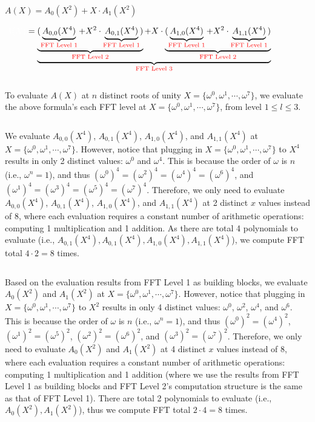 $A(X) = A_0(X^2) + X \cdot A_1(X^2)$

$\mathcolor{white}{A(X)} = \underbrace{\underbrace{(\underbrace{A_{0,0}(X^4)}_{\text{\textcolor{red}{FFT Level 1}}} + X^2\cdot \underbrace{A_{0,1}(X^4)}_{\text{\textcolor{red}{FFT Level 1}}})}_{\text{\textcolor{red}{FFT Level 2}}} + X \cdot \underbrace{(\underbrace{A_{1,0}(X^4)}_{\text{\textcolor{red}{FFT Level 1}}} + X^2\cdot \underbrace{A_{1,1}(X^4)}_{\text{\textcolor{red}{FFT Level 1}}})}_{\text{\textcolor{red}{FFT Level 2}}}}_{\text{\textcolor{red}{FFT Level 3}}}$

$ $

To evaluate $A(X)$ at $n$ distinct roots of unity $X = \{\omega^0, \omega^1, \cdots, \omega^7\}$, we evaluate the above formula's each FFT level at $X = \{\omega^0, \omega^1, \cdots, \omega^7\}$, from level $1 \leq l \leq 3$. 

$ $

 We evaluate $A_{0,0}(X^4)$, $A_{0,1}(X^4)$, $A_{1,0}(X^4)$, and $A_{1,1}(X^4)$ at $X = \{\omega^0, \omega^1, \cdots, \omega^7\}$. However, notice that plugging in $X = \{\omega^0, \omega^1, \cdots, \omega^7\}$ to $X^4$ results in only 2 distinct values: $\omega^0$ and $\omega^4$. This is because the order of $\omega$ is $n$ (i.e., $\omega^n = 1$), and thus $(\omega^0)^4 = (\omega^2)^4 = (\omega^4)^4 = (\omega^6)^4$, and $(\omega^1)^4 = (\omega^3)^4 = (\omega^5)^4 = (\omega^7)^4$. Therefore, we only need to evaluate $A_{0,0}(X^4)$, $A_{0,1}(X^4)$, $A_{1,0}(X^4)$, and $A_{1,1}(X^4)$ at 2 distinct $x$ values instead of 8, where each evaluation requires a constant number of arithmetic operations: computing 1 multiplication and 1 addition. As there are total 4 polynomials to evaluate (i.e., $A_{0, 1}(X^4), A_{0, 1}(X^4), A_{1, 0}(X^4), A_{1, 1}(X^4)$), we compute FFT total $4 \cdot 2 = 8$ times. 

$ $

 Based on the evaluation results from FFT Level 1 as building blocks, we evaluate $A_{0}(X^2)$ and $A_{1}(X^2)$ at $X = \{\omega^0, \omega^1, \cdots, \omega^7\}$. However, notice that plugging in $X = \{\omega^0, \omega^1, \cdots, \omega^7\}$ to $X^2$ results in only 4 distinct values: $\omega^0$, $\omega^2$, $\omega^4$, and $\omega^6$.
This is because the order of $\omega$ is $n$ (i.e., $\omega^n = 1$), and thus $(\omega^0)^2 = (\omega^4)^2$, $(\omega^1)^2 = (\omega^5)^2$, $(\omega^2)^2 = (\omega^6)^2$, and $(\omega^3)^2 = (\omega^7)^2$. Therefore, we only need to evaluate $A_{0}(X^2)$ and $A_{1}(X^2)$ at 4 distinct $x$ values instead of 8, where each evaluation requires a constant number of arithmetic operations: computing 1 multiplication and 1 addition (where we use the results from FFT Level 1 as building blocks and FFT Level 2's computation structure is the same as that of FFT Level 1). There are total 2 polynomials to evaluate (i.e., $A_{0}(X^2), A_{1}(X^2)$), thus we compute FFT total $2 \cdot 4 = 8$ times. 

